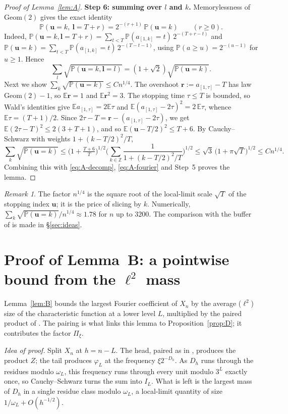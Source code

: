 \documentclass[11pt]{amsart}
\theoremstyle{remark}
\newtheorem{remark}{Remark}[section]
\newcommand{\E}{\mathbb{E}}
\renewcommand{\P}{\mathbb{P}}
\newcommand{\Z}{\mathbb{Z}}
\newcommand{\Geom}{\mathrm{Geom}}
\newcommand{\T}[1]{\cite[#1]{Tao22}}   %
\theoremstyle{plain}
\begin{document}
\begin{proof}[Proof of Lemma~\ref{lem:A}]
\textbf{Step 6: summing over $l$ and $k$.} Memorylessness of $\Geom(2)$ gives the exact identity
\[
\P(\mathbf u=k,\ \mathbf l=T+r)=2^{-(r+1)}\,\P(\mathbf u=k)\qquad(r\ge0).
\]
Indeed, $\P(\mathbf u=k,\mathbf l=T+r)=\sum_{t<T}\P(a_{[1,k]}=t)\,2^{-(T+r-t)}$ and $\P(\mathbf u=k)=\sum_{t<T}\P(a_{[1,k]}=t)\,2^{-(T-t-1)}$, using $\P(a\ge u)=2^{-(u-1)}$ for $u\ge1$. Hence
\[
\sum_{l}\sqrt{\P(\mathbf u=k,\mathbf l=l)}=(1+\sqrt2)\sqrt{\P(\mathbf u=k)} .
\]
Next we show $\sum_k\sqrt{\P(\mathbf u=k)}\le Cn^{1/4}$. The overshoot $\mathbf r:=a_{[1,\tau]}-T$ has law $\Geom(2)-1$, so $\E\mathbf r=1$ and $\E\mathbf r^2=3$. The stopping time $\tau\le T$ is bounded, so Wald's identities give $\E a_{[1,\tau]}=2\E\tau$ and $\E(a_{[1,\tau]}-2\tau)^2=2\,\E\tau$, whence $\E\tau=(T+1)/2$. Since $2\tau-T=\mathbf r-(a_{[1,\tau]}-2\tau)$, we get $\E(2\tau-T)^2\le2(3+T+1)$, and so $\E(\mathbf u-T/2)^2\le T+6$. By Cauchy--Schwarz with weights $1+(k-T/2)^2/T$,
\[
\sum_k\sqrt{\P(\mathbf u=k)}\le\Big(1+\tfrac{T+6}{T}\Big)^{1/2}\Big(\sum_{k\in\Z}\frac{1}{1+(k-T/2)^2/T}\Big)^{1/2}\le\sqrt3\,\big(1+\pi\sqrt T\big)^{1/2}\le Cn^{1/4}.
\]
Combining this with \eqref{eq:A-decomp}, \eqref{eq:A-fourier} and Step~5 proves the lemma.
\end{proof}

\begin{remark}\label{rem:A-quarter}
The factor $n^{1/4}$ is the square root of the local-limit scale $\sqrt T$ of the stopping index $\mathbf u$; it is the price of slicing by $k$. Numerically, $\sum_k\sqrt{\P(\mathbf u=k)}/n^{1/4}\approx1.78$ for $n$ up to $3200$. The comparison with the buffer of \T{\S6} is made in \S\ref{sec:ideas}.
\end{remark}
\section{Proof of Lemma~B: a pointwise bound from the $\ell^2$ mass}\label{sec:B}

Lemma~\ref{lem:B} bounds the largest Fourier coefficient of $X_n$ by the average ($\ell^2$) size of the characteristic function at a lower level $L$, multiplied by the paired product of \T{\S7.1}. The pairing is what links this lemma to Proposition~\ref{prop:D}; it contributes the factor $\Pi_\xi$.

\emph{Idea of proof.} Split $X_n$ at $h=n-L$. The head, paired as in \T{\S7.1}, produces the product $Z$; the tail produces $\varphi_L$ at the frequency $\xi2^{-D_h}$. As $D_h$ runs through the residues modulo $\omega_L$, this frequency runs through every unit modulo $3^L$ exactly once, so Cauchy--Schwarz turns the sum into $I_L$. What is left is the largest mass of $D_h$ in a single residue class modulo $\omega_L$, a local-limit quantity of size $1/\omega_L+O(h^{-1/2})$.
\end{document}
